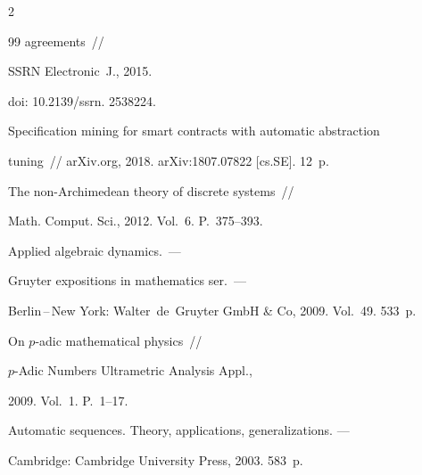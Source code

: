 \begin{multicols}{2}
{{\begin{thebibliography}{99}
  agreements~//


{SSRN Electronic~J.}, 2015.


doi: 10.2139/\mbox{ssrn}. 2538224.









Specification mining for smart contracts with automatic abstraction


  tuning~// arXiv.org, 2018. arXiv:1807.07822 [cs.SE]. 12~p.









The non-{A}rchimedean theory of discrete systems~//


Math. Comput.  Sci., 2012. Vol.~6. P.~375--393.









{Applied algebraic dynamics.}~---


Gruyter expositions in mathematics ser.~---


Berlin\,--\,New York: Walter~de~Gruyter GmbH \& Co, 2009. Vol.~49. 533~p.












On $p$-adic mathematical physics~//


$p$-Adic Numbers Ultrametric Analysis Appl.,


2009. Vol.~1. P.~1--17.















Automatic sequences. Theory, applications, generalizations. ---


Cambridge: Cambridge University Press, 2003. 583~p.






\end{thebibliography}}}
\end{multicols}
